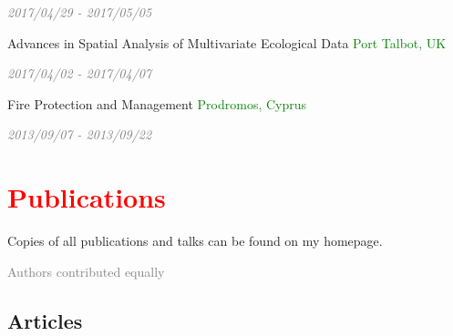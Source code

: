 \documentclass[hidelinks]{report}
\begin{document}
\hfill
\textcolor{grey}{\textit{2017/04/29 - 2017/05/05}}

Advances in Spatial Analysis of Multivariate Ecological Data
\hfill
\textcolor{green}{Port Talbot, UK}

\hfill
\textcolor{grey}{\textit{2017/04/02 - 2017/04/07}}

Fire Protection and Management
\hfill
\textcolor{green}{Prodromos, Cyprus}

\hfill
\textcolor{grey}{\textit{2013/09/07 - 2013/09/22}}


\section*{\textcolor{red}{Publications} \sout{\hfill}}

\footnotesize{Copies of all publications and talks can be found on my homepage.}

\textcolor{grey}{\footnotesize{\Cross \hspace{0.1em} Authors contributed equally}}

\subsection*{Articles}
\end{document}
